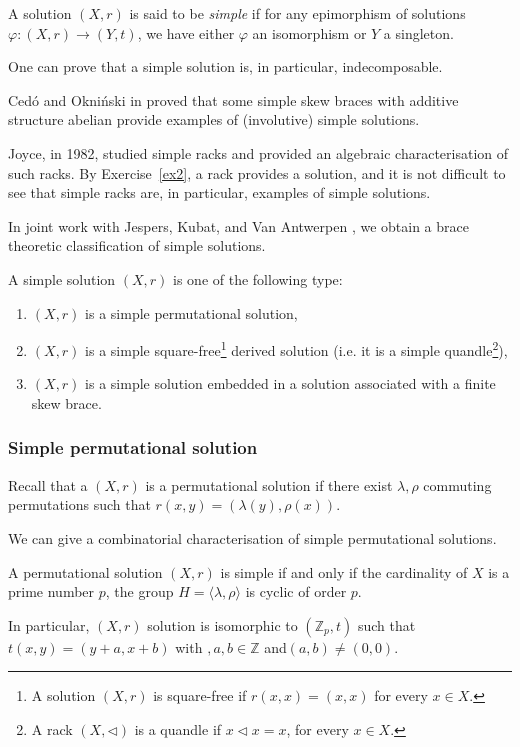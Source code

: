 \begin{definition}
    A solution $(X,r)$ is said to be \emph{simple} if for any epimorphism of solutions $\varphi: (X,r) \to (Y,t)$, we have either $\varphi$ an isomorphism or $Y$ a singleton.
\end{definition}

One can prove that a simple solution is, in particular, indecomposable. 

Cedó and Okniński in \cite{MR4391683} proved that some simple skew braces with additive structure abelian provide examples of (involutive) simple solutions. 

Joyce, in 1982, studied simple racks and provided an algebraic characterisation of such racks. By Exercise~\ref{ex2}, a rack provides a solution, and it is not difficult to see that simple racks are, in particular, examples of simple solutions. 

In joint work with Jespers, Kubat, and Van Antwerpen \cite{colazzo2023simple}, we obtain a brace theoretic classification of simple solutions. 

\begin{theorem}
    A simple solution $(X,r)$ is one of the following type:
    \begin{enumerate}
        \item $(X,r)$ is a simple permutational solution,
        \item $(X,r)$ is a simple square-free\footnote{A solution $(X,r)$ is square-free if $r(x,x)=(x,x)$ for every $x\in X$.} derived solution (i.e. it is a simple quandle\footnote{A rack $(X,\triangleleft)$ is a quandle if $x\triangleleft x = x$, for every $x\in X$.}),
        \item $(X,r)$ is a simple solution embedded in a solution associated with a finite skew brace. 
    \end{enumerate}
\end{theorem}

\subsubsection{Simple permutational solution}

Recall that a $(X,r)$ is a permutational solution if there exist $\lambda,\rho$ commuting permutations such that $r(x,y)=(\lambda(y),\rho(x))$.

We can give a combinatorial characterisation of simple permutational solutions.

\begin{proposition}
    A permutational solution $(X,r)$ is simple if and only if the cardinality of $X$ is a prime number $p$, the group $H=\langle\lambda,\rho\rangle$ is cyclic of order $p$.

    In particular, $(X,r)$ solution is isomorphic to $(\mathbb{Z}_p,t)$ such that $t(x,y)= (y+a,x+b)$ with $,a,b\in \mathbb{Z}$ and$(a,b)\neq (0,0)$.
\end{proposition}


